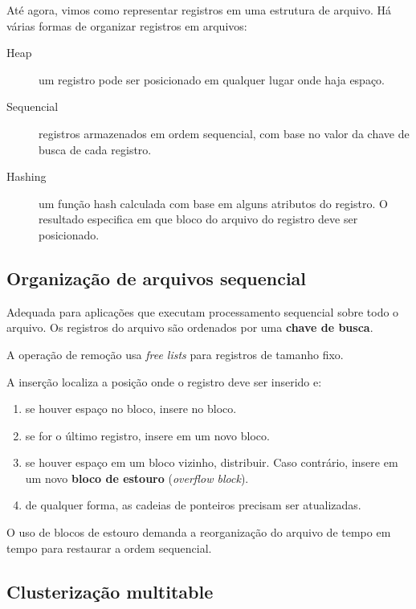 Até agora, vimos como representar registros em uma estrutura de arquivo.
Há várias formas de organizar registros em arquivos:
\begin{description}
\item[Heap] um registro pode ser posicionado em qualquer lugar onde haja espaço.

\item[Sequencial] registros armazenados em ordem sequencial, com base
no valor da chave de busca de cada registro.

\item[Hashing] um função hash calculada com base em alguns atributos do 
registro. O resultado especifica em que bloco do arquivo do registro
deve ser posicionado.
\end{description}

\subsection{Organização de arquivos sequencial}

Adequada para aplicações que executam processamento sequencial sobre todo o arquivo.
Os registros do arquivo são ordenados por uma \textbf{chave de busca}.

A operação de remoção usa \emph{free lists} para registros de tamanho fixo.

A inserção localiza a posição onde o registro deve ser inserido e:
\begin{enumerate}
\item se houver espaço no bloco, insere no bloco.
\item se for o último registro, insere em um novo bloco.
\item se houver espaço em um bloco vizinho, distribuir. Caso contrário,
insere em um novo \textbf{bloco de estouro} (\emph{overflow block}).
\item de qualquer forma, as cadeias de ponteiros precisam ser atualizadas.
\end{enumerate}
O uso de blocos de estouro demanda a reorganização do arquivo de tempo em tempo
para restaurar a ordem sequencial.

\subsection{Clusterização multitable}

